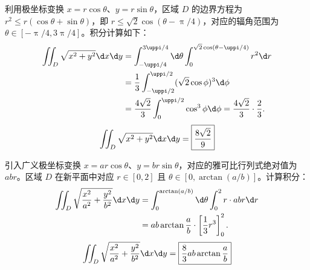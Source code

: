 \begin{solution}

    利用极坐标变换 $x = r \cos \theta$、$y = r \sin \theta$，区域 $D$ 的边界方程为 $r^2 \leqslant r(\cos \theta + \sin \theta)$，即 $r \leqslant \sqrt{2} \cos(\theta - \uppi/4)$，对应的辐角范围为 $\theta \in [-\uppi/4, 3\uppi/4]$。积分计算如下：
    \begin{equation}
        \begin{aligned}
            \iint_D \sqrt{x^2+y^2} \d x \d y & = \int_{-\uppi/4}^{3\uppi/4} \d \theta \int_0^{\sqrt{2}\cos(\theta - \uppi/4)} r^2 \d r             \\
                                             & = \frac{1}{3} \int_{-\uppi/2}^{\uppi/2} (\sqrt{2}\cos \phi)^3 \d \phi \label{eq:int-1-step}         \\
                                             & = \frac{4\sqrt{2}}{3} \int_0^{\uppi/2} \cos^3 \phi \d \phi = \frac{4\sqrt{2}}{3} \cdot \frac{2}{3}.
        \end{aligned}
    \end{equation}
    \begin{equation}
        \iint_D \sqrt{x^2+y^2} \d x \d y = \boxed{\frac{8\sqrt{2}}{9}}
    \end{equation}


    引入广义极坐标变换 $x = ar\cos\theta$、$y = br\sin\theta$，对应的雅可比行列式绝对值为 $abr$。区域 $D$ 在新平面中对应 $r \in [0, 2]$ 且 $\theta \in [0, \arctan(a/b)]$。计算积分：
    \begin{equation}
        \begin{aligned}
            \iint_D \sqrt{\frac{x^2}{a^2} + \frac{y^2}{b^2}} \d x \d y & = \int_0^{\arctan(a/b)} \d \theta \int_0^2 r \cdot abr \d r      \\
                                                                       & = ab \arctan\frac{a}{b} \cdot \left[ \frac{1}{3}r^3 \right]_0^2.
        \end{aligned}
    \end{equation}
    \begin{equation}
        \iint_D \sqrt{\frac{x^2}{a^2} + \frac{y^2}{b^2}} \d x \d y = \boxed{\frac{8}{3}ab \arctan\frac{a}{b}}
    \end{equation}



\end{solution}
